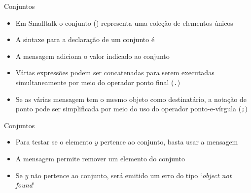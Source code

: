 \begin{frame}[fragile]{Conjuntos}

    \begin{itemize}
        \item Em Smalltalk o conjunto () representa uma coleção de elementos
            únicos

        \item A sintaxe para a declaração de um conjunto é


        \item A mensagem  adiciona o valor indicado ao conjunto

        \item Várias expressões podem ser concatenadas para serem executadas simultaneamente
            por meio do operador ponto final (\texttt{.})


        \item Se as várias mensagem tem o mesmo objeto como destinatário, a notação
            de ponto pode ser simplificada por meio do uso do operador ponto-e-vírgula
            (\texttt{;})

    \end{itemize}

\end{frame}

\begin{frame}[fragile]{Conjuntos}

    \begin{itemize}

        \item Para testar se o elemento $y$ pertence ao conjunto, basta usar a mensagem


        \item A mensagem  permite remover um elemento do
            conjunto


        \item Se $y$ não pertence ao conjunto, será emitido um erro do tipo `\textit{object
            not found}'
    \end{itemize}

\end{frame}

